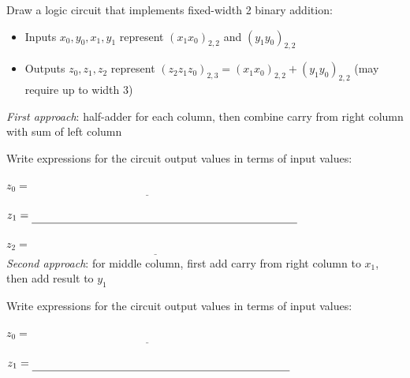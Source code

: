 
Draw a logic circuit that implements fixed-width 2 binary addition:
\begin{itemize}
\item Inputs  $x_0, y_0, x_1, y_1$ represent $(x_1  x_0)_{2,2}$ and $(y_1 y_0)_{2,2}$
\item Outputs  $z_0, z_1, z_2$ represent $(z_2  z_1 z_0)_{2,3} = (x_1  x_0)_{2,2} + (y_1 y_0)_{2,2}$ (may require up to width  $3$)
\end{itemize}

{\it First approach}: half-adder for each column, then combine carry from right column with sum of left column

\vfill



Write expressions for the circuit output values in terms of input values:


$z_0 = \underline{\phantom{x_0 \oplus y_0\hspace{3in}}}$


$z_1 = \underline{\phantom{(x_1 \oplus y_1) \oplus c_0}\hspace{2.5in}}$ \phantom{where $c_0 = x_0 \land y_0$}


$z_2 = \underline{\phantom{(c_0 \land (x_1 \oplus y_1)) \oplus c_1}\hspace{2in}}$ \phantom{where $c_1 = x_1 \land y_1$}\\

{\it Second approach}: for middle column, first add carry from right column to $x_1$, then add result to $y_1$

\vfill


Write expressions for the circuit output values in terms of input values:


$z_0 = \underline{\phantom{x_0 \oplus y_0}\hspace{3in}}$


$z_1 = \underline{ \phantom{(c_0 \oplus x_1) \oplus y_1}\hspace{2.4in}}$ \phantom{where $c_0 = x_0 \land y_0$}

